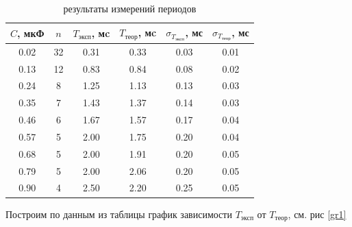 \documentclass[a4paper,14pt]{article}
\begin{document}
\begin{table}[hbt!]
	\begin{center}
	\begin{tabular}{|c|c|c|c|c|c|}
		\hline
		$C$, мкФ & $n$  & $T_{\text{эксп}}$, мc & $T_{\text{теор}}$, мc & $\sigma_{T_{\text{эксп}}}$, мс & $\sigma_{T_{\text{теор}}}$, мс \\ \hline
		0.02   & 32 & 0.31          & 0.33          & 0.03                           & 0.01                           \\ \hline
		0.13   & 12 & 0.83          & 0.84          & 0.08                           & 0.02                           \\ \hline
		0.24   & 8  & 1.25          & 1.13          & 0.13                           & 0.03                           \\ \hline
		0.35   & 7  & 1.43          & 1.37          & 0.14                           & 0.03                           \\ \hline
		0.46   & 6  & 1.67          & 1.57          & 0.17                           & 0.04                           \\ \hline
		0.57   & 5  & 2.00          & 1.75          & 0.20                           & 0.04                           \\ \hline
		0.68   & 5  & 2.00          & 1.91          & 0.20                           & 0.05                           \\ \hline
		0.79   & 5  & 2.00          & 2.06          & 0.20                           & 0.05                           \\ \hline
		0.90   & 4  & 2.50          & 2.20          & 0.25                           & 0.05                           \\ \hline
	\end{tabular}
	\caption{результаты измерений периодов}
	\label{tab1}
	\end{center}
\end{table}

Построим по данным из таблицы график зависимости $T_{\text{эксп}}$ от $T_{\text{теор}}$, см. рис \ref{gr1}
\end{document}
